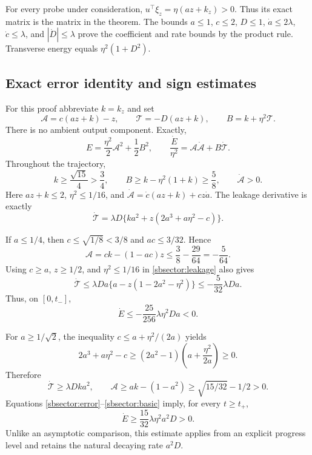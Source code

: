 \documentclass{article} %
\theoremstyle{plain}
\theoremstyle{definition}
\theoremstyle{remark}
\begin{document}
For every probe under consideration,
$u^\top\xi_z=\eta(az+k_z)>0$. Thus its exact matrix is the matrix in
the theorem. The bounds $a\le1$, $c\le2$, $D\le1$,
$\dot a\le2\lambda$, $\dot c\le\lambda$, and
$|\dot D|\le\lambda$ prove the coefficient and rate bounds by the
product rule. Transverse energy equals $\eta^2(1+D^2)$.

\subsection{Exact error identity and sign estimates}
For this proof abbreviate $k=k_z$ and set
\[
 \mathcal A=c(az+k)-z,
 \qquad \mathcal T=-D(az+k),
 \qquad B=k+\eta^2\mathcal T.
\]
There is no ambient output component. Exactly,
\begin{equation}\label{sbsector:error}
 E=\frac{\eta^2}{2}\mathcal A^2+\frac12B^2,
 \qquad
 \frac{\dot E}{\eta^2}
 =\mathcal A\dot{\mathcal A}+B\dot{\mathcal T}.
\end{equation}
Throughout the trajectory,
\begin{equation}\label{sbsector:basic}
 k\ge\frac{\sqrt{15}}4>\frac34,\qquad
 B\ge k-\eta^2(1+k)\ge\frac58,
 \qquad\dot{\mathcal A}>0.
\end{equation}
Here $az+k\le2$, $\eta^2\le1/16$, and
$\dot{\mathcal A}=\dot c(az+k)+cz\dot a$.
The leakage derivative is exactly
\begin{equation}\label{sbsector:leakage}
 \dot{\mathcal T}
 =\lambda D\{ka^2+z(2a^3+a\eta^2-c)\}.
\end{equation}

If $a\le1/4$, then
$c\le\sqrt{1/8}<3/8$ and $ac\le3/32$. Hence
\[
 \mathcal A=ck-(1-ac)z\le\frac38-\frac{29}{64}
 =-\frac5{64}.
\]
Using $c\ge a$, $z\ge1/2$, and $\eta^2\le1/16$ in
\eqref{sbsector:leakage} also gives
\[
 \dot{\mathcal T}
 \le\lambda Da\{a-z(1-2a^2-\eta^2)\}
 \le-\frac5{32}\lambda Da.
\]
Thus, on $[0,t_-]$,
\begin{equation}\label{sbsector:early-sign}
 \dot E\le-\frac{25}{256}\lambda\eta^2Da<0.
\end{equation}

For $a\ge1/\sqrt2$, the inequality
$c\le a+\eta^2/(2a)$ yields
\[
 2a^3+a\eta^2-c
 \ge(2a^2-1)\left(a+\frac{\eta^2}{2a}\right)\ge0.
\]
Therefore
\[
 \dot{\mathcal T}\ge\lambda Dka^2,
 \qquad
 \mathcal A\ge ak-(1-a^2)
 \ge\sqrt{15/32}-1/2>0.
\]
Equations \eqref{sbsector:error}--\eqref{sbsector:basic} imply, for
every $t\ge t_+$,
\begin{equation}\label{sbsector:late-sign}
 \dot E\ge\frac{15}{32}\lambda\eta^2a^2D>0.
\end{equation}
Unlike an asymptotic comparison, this estimate applies from an explicit
progress level and retains the natural decaying rate $a^2D$.
\end{document}
